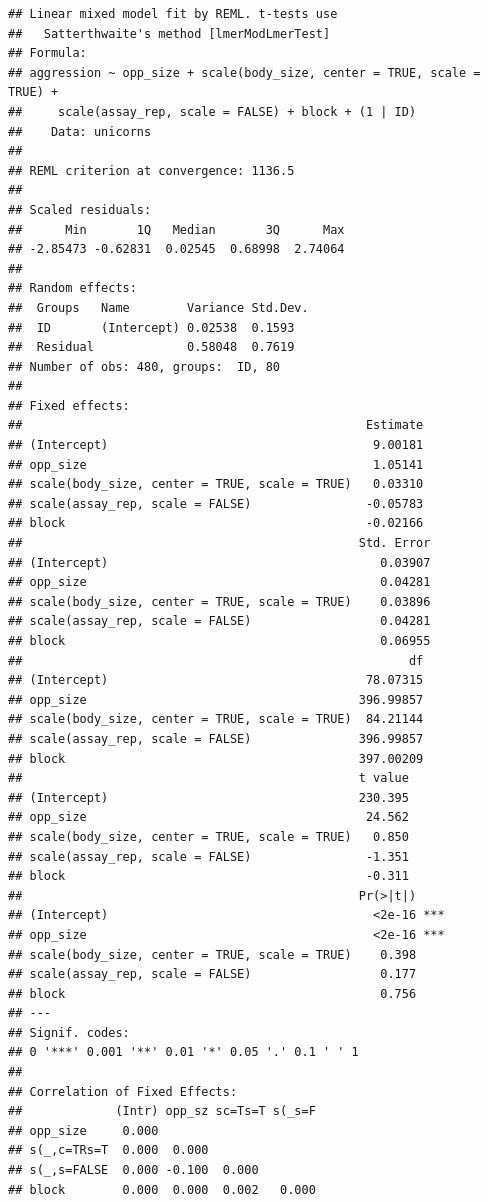 \documentclass[
  12pt,
]{book}
\begin{document}
\begin{verbatim}
## Linear mixed model fit by REML. t-tests use
##   Satterthwaite's method [lmerModLmerTest]
## Formula: 
## aggression ~ opp_size + scale(body_size, center = TRUE, scale = TRUE) +  
##     scale(assay_rep, scale = FALSE) + block + (1 | ID)
##    Data: unicorns
## 
## REML criterion at convergence: 1136.5
## 
## Scaled residuals: 
##      Min       1Q   Median       3Q      Max 
## -2.85473 -0.62831  0.02545  0.68998  2.74064 
## 
## Random effects:
##  Groups   Name        Variance Std.Dev.
##  ID       (Intercept) 0.02538  0.1593  
##  Residual             0.58048  0.7619  
## Number of obs: 480, groups:  ID, 80
## 
## Fixed effects:
##                                                Estimate
## (Intercept)                                     9.00181
## opp_size                                        1.05141
## scale(body_size, center = TRUE, scale = TRUE)   0.03310
## scale(assay_rep, scale = FALSE)                -0.05783
## block                                          -0.02166
##                                               Std. Error
## (Intercept)                                      0.03907
## opp_size                                         0.04281
## scale(body_size, center = TRUE, scale = TRUE)    0.03896
## scale(assay_rep, scale = FALSE)                  0.04281
## block                                            0.06955
##                                                      df
## (Intercept)                                    78.07315
## opp_size                                      396.99857
## scale(body_size, center = TRUE, scale = TRUE)  84.21144
## scale(assay_rep, scale = FALSE)               396.99857
## block                                         397.00209
##                                               t value
## (Intercept)                                   230.395
## opp_size                                       24.562
## scale(body_size, center = TRUE, scale = TRUE)   0.850
## scale(assay_rep, scale = FALSE)                -1.351
## block                                          -0.311
##                                               Pr(>|t|)    
## (Intercept)                                     <2e-16 ***
## opp_size                                        <2e-16 ***
## scale(body_size, center = TRUE, scale = TRUE)    0.398    
## scale(assay_rep, scale = FALSE)                  0.177    
## block                                            0.756    
## ---
## Signif. codes:  
## 0 '***' 0.001 '**' 0.01 '*' 0.05 '.' 0.1 ' ' 1
## 
## Correlation of Fixed Effects:
##             (Intr) opp_sz sc=Ts=T s(_s=F
## opp_size     0.000                      
## s(_,c=TRs=T  0.000  0.000               
## s(_,s=FALSE  0.000 -0.100  0.000        
## block        0.000  0.000  0.002   0.000
\end{verbatim}
\end{document}
